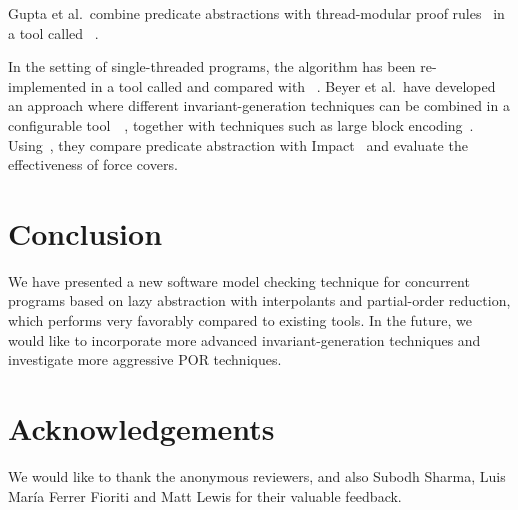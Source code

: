 \documentclass[conference]{IEEEtran}
\begin{document}

Gupta et al.~combine predicate abstractions with
thread-modular proof rules~\cite{DBLP:journals/acta/OwickiG76,
DBLP:journals/toplas/Jones83} in a tool called
~\cite{DBLP:conf/popl/GuptaPR11}.

In the setting of single-threaded programs, the  algorithm has been 
re-implemented in a tool called  
and compared with ~\cite{kw2011-cav}.  
Beyer et al.~have developed an approach where different invariant-generation
techniques can be combined in a configurable tool~~\cite{DBLP:conf/cav/BeyerK11}, together
with techniques such as large block
encoding~\cite{DBLP:conf/fmcad/BeyerCGKS09}.  
Using~, they compare
predicate abstraction with Impact~\cite{DBLP:conf/fmcad/BeyerW12} 
and evaluate the effectiveness of force covers. 


\section{Conclusion} 
\label{sec:conclusion}

We have presented a new software model checking technique for concurrent
programs based on lazy abstraction with interpolants and partial-order reduction,
which performs very favorably compared to existing tools.  
In the future, we would like to incorporate more advanced invariant-generation
techniques and investigate more aggressive
POR techniques. 

\section*{Acknowledgements}
We would like to thank the anonymous reviewers,
and also Subodh Sharma, Luis Mar\'ia Ferrer Fioriti and Matt Lewis  
for their valuable feedback.




\end{document}
